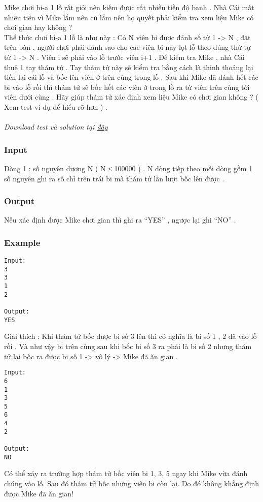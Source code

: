 



   Mike chơi bi-a 1 lỗ rất giỏi nên kiếm được rất nhiều tiền độ banh . Nhà Cái mất nhiều tiền vì Mike lắm nên cú lắm nên họ quyết phải kiểm tra xem liệu Mike có chơi gian hay không ?   
\\   Thể thức chơi bi-a 1 lỗ là như này : Có N viên bi được đánh số từ 1 -> N , đặt trên bàn , người chơi phải đánh sao cho các viên bi này lọt lỗ theo đúng thứ tự từ 1 -> N . Viên i sẽ phải vào lỗ trước viên i+1 . Để kiểm tra Mike , nhà Cái thuê 1 tay thám tử . Tay thám tử này sẽ kiểm tra bằng cách là thỉnh thoảng lại tiến lại cái lỗ và bốc lên viên ở trên cùng trong lỗ . Sau khi Mike đã đánh hết các bi vào lỗ rồi thì thám tử sẽ bốc hết các viên ở trong lỗ ra từ viên trên cùng tới viên dưới cùng . Hãy giúp thám tử xác định xem liệu Mike có chơi gian không ? ( Xem test ví dụ để hiểu rõ hơn ) .   
\\
\\\textit{    Download test và solution tại    \href{https://vn.spoj.pl/content/cheat.zip}{     đây    }}

\subsubsection{   Input  }

   Dòng 1 : số nguyên dương N ( N ≤ 100000 ) . N dòng tiếp theo mỗi dòng gồm 1 số nguyên ghi ra số chỉ trên trái bi mà thám tử lần lượt bốc lên được .  

\subsubsection{   Output  }

   Nếu xác định được Mike chơi gian thì ghi ra “YES” , ngược lại ghi “NO” .  

\subsubsection{   Example  }
\begin{verbatim}
Input:
3
3
1
2

Output:
YES
\end{verbatim}

   Giải thích : Khi thám tử bốc được bi số 3 lên thì có nghĩa là bi số 1 , 2 đã vào lỗ rồi . Và như vậy bi trên cùng sau khi bốc bi số 3 ra phải là bi số 2 nhưng thám tử lại bốc ra được bi số 1 -> vô lý -> Mike đã ăn gian .  
\begin{verbatim}
Input:
6
1
3
5
6
4
2

Output:
NO
\end{verbatim}

   Có thể xảy ra trường hợp thám tử bốc viên bi 1, 3, 5 ngay khi Mike vừa đánh chúng vào lỗ. Sau đó thám tử bốc những viên bi còn lại. Do đó không khẳng định được Mike đã ăn gian!  
